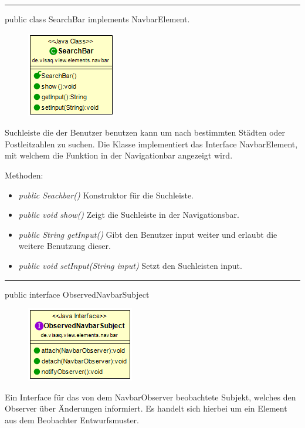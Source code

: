 \rule{\textwidth}{0.4pt} 
public class SearchBar implements NavbarElement.

\begin{minipage}{0.3\textwidth}
    \begin{figure}[H]
        \includegraphics[scale = 0.6]{media/frontend/view/de.view.elements.navbar/SearchbarClass.png}
    \end{figure}
    \end{minipage} \hfill
    \begin{minipage}{0.6\textwidth}
Suchleiste die der Benutzer benutzen kann um nach bestimmten Städten oder Postleitzahlen zu suchen. Die Klasse implementiert das Interface NavbarElement, mit welchem die Funktion in der Navigationbar angezeigt wird.
\end{minipage}

Methoden:
\begin{itemize} 
    \item \emph{public Seachbar()} Konstruktor für die Suchleiste.
    \item \emph{public void show()} Zeigt die Suchleiste in der Navigationsbar.
    \item \emph{public String getInput()} Gibt den Benutzer input weiter und erlaubt die weitere Benutzung dieser.
    \item \emph{public void setInput(String input)} Setzt den Suchleisten input.
\end{itemize}

\rule{\textwidth}{0.4pt} 
public interface ObservedNavbarSubject

\begin{minipage}{0.3\textwidth}
    \begin{figure}[H]
        \includegraphics[scale = 0.6]{media/frontend/view/de.view.elements.navbar/ObservedNavbarSubjectClass.png}
    \end{figure}
    \end{minipage} \hfill
\begin{minipage}{0.6\textwidth}
Ein Interface für das von dem NavbarObserver beobachtete Subjekt, welches den Observer über Änderungen informiert.  Es handelt sich hierbei um ein Element aus dem Beobachter Entwurfsmuster.
\end{minipage}

